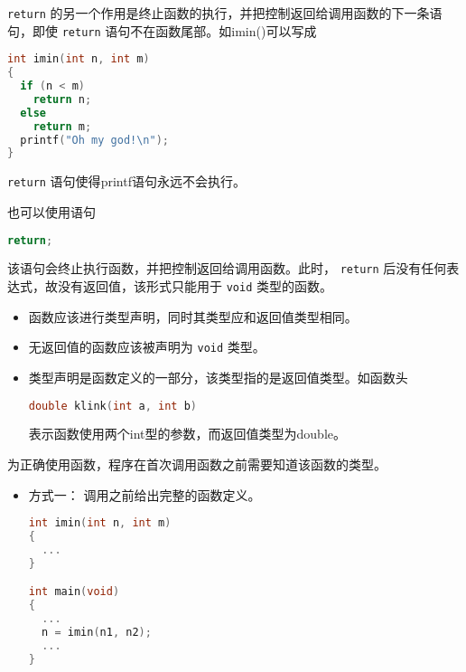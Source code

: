 \begin{frame}[fragile]
 \lstinline|return| 的另一个作用是终止函数的执行，并把控制返回给调用函数的下一条语句，即使 \lstinline|return| 语句不在函数尾部。如{\tf imin()}可以写成
\begin{lstlisting}[language=c,backgroundcolor=\color{red!10}]
int imin(int n, int m)
{  
  if (n < m)
    return n;
  else
    return m;  
  printf("Oh my god!\n");    
}
\end{lstlisting}
 \lstinline|return| 语句使得{\tf printf}语句永远不会执行。
\end{frame}

\begin{frame}[fragile]
也可以使用语句
\begin{lstlisting}[language=c,backgroundcolor=\color{red!10}]
return;
\end{lstlisting}
该语句会终止执行函数，并把控制返回给调用函数。此时， \lstinline|return| 后没有任何表达式，故没有返回值，该形式只能用于 \lstinline|void| 类型的函数。
\end{frame}

\begin{frame}[fragile]
\begin{itemize}
\item
函数应该进行类型声明，同时其类型应和返回值类型相同。\\[0.1in]
\item
无返回值的函数应该被声明为 \lstinline|void| 类型。\\[0.1in]
\item
类型声明是函数定义的一部分，该类型指的是返回值类型。如函数头
\begin{lstlisting}[language=c,backgroundcolor=\color{red!10}]
double klink(int a, int b)
\end{lstlisting}
表示函数使用两个{\tf int}型的参数，而返回值类型为{\tf double}。
\end{itemize}
\end{frame}

\begin{frame}[fragile]
为正确使用函数，程序在首次调用函数之前需要知道该函数的类型。
\begin{itemize}
\item 方式一：
调用之前给出完整的函数定义。\\[0.1in]
\begin{lstlisting}[language=c,backgroundcolor=\color{red!10}]
int imin(int n, int m)
{
  ... 
}

int main(void)
{
  ...
  n = imin(n1, n2);
  ...
}
\end{lstlisting}
\end{itemize}
\end{frame}

